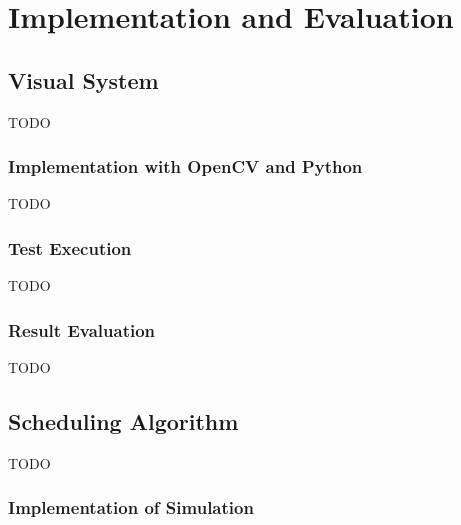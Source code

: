 \chapter{Implementation and Evaluation}
\label{chap:impl}


\section{Visual System}
TODO
\subsection{Implementation with OpenCV and Python}
TODO
\subsection{Test Execution}
TODO
\subsection{Result Evaluation}
TODO

\section{Scheduling Algorithm}
TODO
\subsection{Implementation of Simulation}


